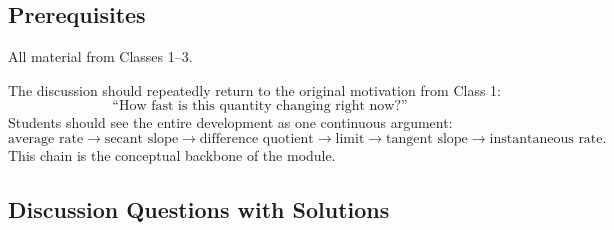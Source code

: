 \documentclass{article}
\begin{document}
\subsection*{Prerequisites}

All material from Classes 1--3.

\begin{tcolorbox}[title=Connecting to Prior Learning]
The discussion should repeatedly return to the original motivation from Class 1:
\[
\text{``How fast is this quantity changing right now?''}
\]
Students should see the entire development as one continuous argument:
\[
\text{average rate}
\longrightarrow
\text{secant slope}
\longrightarrow
\text{difference quotient}
\longrightarrow
\text{limit}
\longrightarrow
\text{tangent slope}
\longrightarrow
\text{instantaneous rate}.
\]
This chain is the conceptual backbone of the module.
\end{tcolorbox}

\subsection*{Discussion Questions with Solutions}
\end{document}
